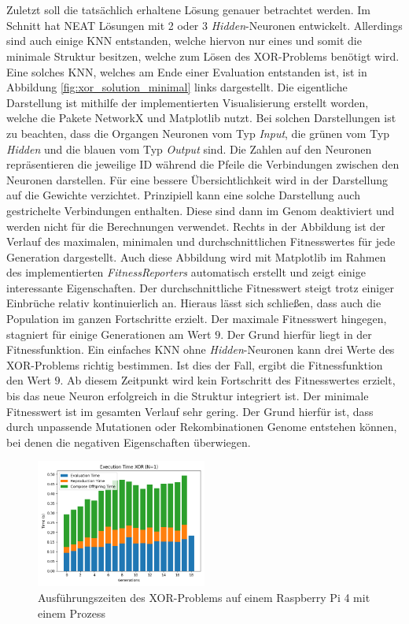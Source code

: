 \\\\
Zuletzt soll die tatsächlich erhaltene Lösung genauer betrachtet werden. Im Schnitt hat \ac{NEAT} Lösungen mit 2 oder 3 \emph{Hidden}-Neuronen entwickelt. Allerdings sind auch einige \ac{KNN} entstanden, welche hiervon nur eines und somit die minimale Struktur besitzen, welche zum Lösen des XOR-Problems benötigt wird. Eine solches \ac{KNN}, welches am Ende einer Evaluation entstanden ist, ist in Abbildung \ref{fig:xor_solution_minimal} links dargestellt. Die eigentliche Darstellung ist mithilfe der implementierten Visualisierung  erstellt worden, welche die Pakete NetworkX und Matplotlib nutzt. Bei solchen Darstellungen ist zu beachten, dass die Organgen Neuronen vom Typ \emph{Input}, die grünen vom Typ \emph{Hidden} und die blauen vom Typ \emph{Output} sind. Die Zahlen auf den Neuronen repräsentieren die jeweilige ID während die Pfeile die Verbindungen zwischen den Neuronen darstellen. Für eine bessere Übersichtlichkeit wird in der Darstellung auf die Gewichte verzichtet. Prinzipiell kann eine solche Darstellung auch gestrichelte Verbindungen enthalten. Diese sind dann im Genom deaktiviert und werden nicht für die Berechnungen verwendet. Rechts in der Abbildung ist der Verlauf des maximalen, minimalen und durchschnittlichen Fitnesswertes für jede Generation dargestellt. Auch diese Abbildung wird mit Matplotlib im Rahmen des implementierten \emph{FitnessReporters} automatisch erstellt und zeigt einige interessante Eigenschaften. Der durchschnittliche Fitnesswert steigt trotz einiger Einbrüche relativ kontinuierlich an. Hieraus lässt sich schließen, dass auch die Population im ganzen Fortschritte erzielt. Der maximale Fitnesswert hingegen, stagniert für einige Generationen am Wert $9$. Der Grund hierfür liegt in der Fitnessfunktion. Ein einfaches \ac{KNN} ohne \emph{Hidden}-Neuronen kann drei Werte des XOR-Problems richtig bestimmen. Ist dies der Fall, ergibt die Fitnessfunktion den Wert $9$. Ab diesem Zeitpunkt wird kein Fortschritt des Fitnesswertes erzielt, bis das neue Neuron erfolgreich in die Struktur integriert ist. Der minimale Fitnesswert ist im gesamten Verlauf sehr gering. Der Grund hierfür ist, dass durch unpassende Mutationen oder Rekombinationen Genome entstehen können, bei denen die negativen Eigenschaften überwiegen. 
\begin{figure}[!h]
	\centering
	\includegraphics[width=0.5\textwidth]{./img/xor_single_core/xor_time.png} 
	\caption{Ausführungszeiten des XOR-Problems auf einem Raspberry Pi 4 mit einem Prozess}
	\label{fig:xor_single_core_performance}
\end{figure}
